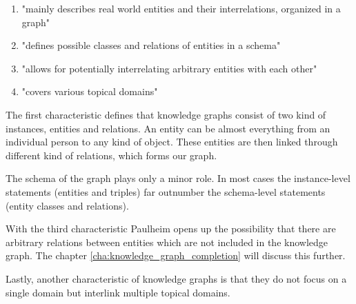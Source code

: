 \begin{enumerate}
\item "mainly describes real world entities and their interrelations, organized in a graph"
\item "defines possible classes and relations of entities
in a schema"
\item "allows for potentially interrelating arbitrary entities with each other"
\item "covers various topical domains"
\end{enumerate}

The first characteristic defines that knowledge graphs consist of two kind of instances, entities and relations. An entity can be almost everything from an individual person to any kind of object. These entities are then linked through different kind of relations, which forms our graph. 

The schema of the graph plays only a minor role. In most cases the instance-level statements (entities and triples) far outnumber the schema-level statements (entity classes and relations). 

With the third characteristic Paulheim opens up the possibility that there are arbitrary relations between entities which are not included in the knowledge graph. The chapter \ref{cha:knowledge_graph_completion} will discuss this further. 

Lastly, another characteristic of knowledge graphs is that they do not focus on a single domain but interlink multiple topical domains. 